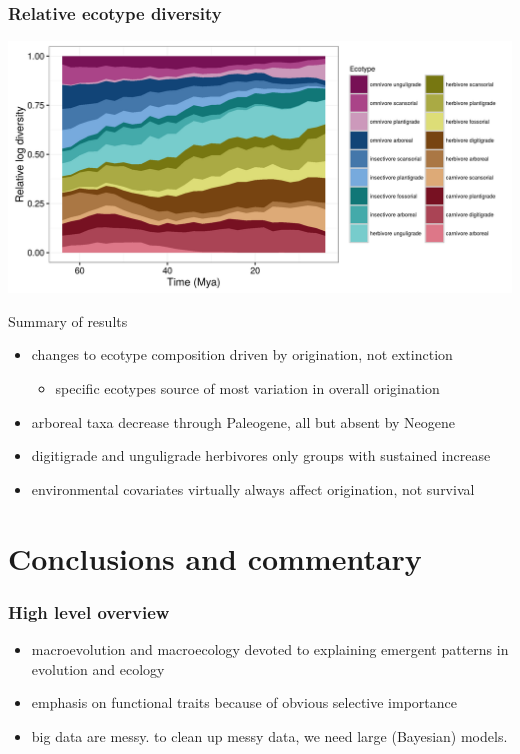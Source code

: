 \documentclass{beamer}
\begin{document}
\begin{frame}
  \frametitle{Relative ecotype diversity}
  \begin{center}
    \includegraphics[height=0.8\textheight,width=\textwidth,keepaspectratio=true]{figure/relative_diversity}
  \end{center}
\end{frame}

\begin{frame}
  \begin{block}{Summary of results}
    \begin{itemize}
      \item changes to ecotype composition driven by origination, not extinction
        \begin{itemize}
          \item specific ecotypes source of most variation in overall origination
        \end{itemize}
      \item arboreal taxa decrease through Paleogene, all but absent by Neogene
      \item digitigrade and unguligrade herbivores only groups with sustained increase
      \item environmental covariates virtually always affect origination, not survival
    \end{itemize}
  \end{block}
\end{frame}



\section{Conclusions and commentary}
\begin{frame}
  \frametitle{High level overview}
  \begin{itemize}
    \item macroevolution and macroecology devoted to explaining emergent patterns in evolution and ecology
    \item emphasis on functional traits because of obvious selective importance
    \item big data are messy. to clean up messy data, we need large (Bayesian) models.
  \end{itemize}
\end{frame}
\end{document}
